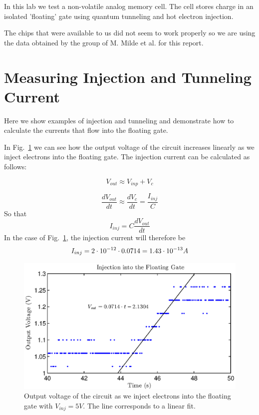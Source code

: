 

\newcommand{\reffig}[1]{Fig.~\ref{#1}}



\newpage

In this lab we test a non-volatile analog memory cell. The cell stores charge in an isolated 'floating' gate using quantum tunneling and hot electron injection. 

The chips that were  available to us did not seem to work properly so we are using the data obtained by the group of M. Milde et al. for this report. \\

\section{Measuring Injection and Tunneling Current}

Here we show examples of injection and tunneling and demonstrate how to calculate the currents that flow into the floating gate. 

In Fig.~\ref{fig:exp1a} we can see how the output voltage of the circuit increases linearly as we inject electrons into the floating gate. The injection current can be calculated as follows:

\begin{equation*}
	V_{out}\approx V_{inp}+V_c
\end{equation*}

\begin{equation*}
	\frac{dV_{out}}{dt}\approx \frac{dV_c}{dt} = \frac{I_{inj}}{C}
\end{equation*}
So that
\begin{equation*}
	I_{inj} = C\frac{dV_{out}}{dt}
\end{equation*}
In the case of Fig.~\ref{fig:exp1a}, the injection current will therefore be 
\begin{equation*}
	I_{inj}=2\cdot10^{-12}\cdot0.0714 = 1.43\cdot10^{-13} A\\
\end{equation*}

\begin{figure}[!h]
	\center
	\includegraphics{exp1a.eps}
	\caption{Output voltage of the circuit as we inject electrons into the floating gate with $V_{inj}=5 V$. The line corresponds to a linear fit.}
	\label{fig:exp1a}
\end{figure}

